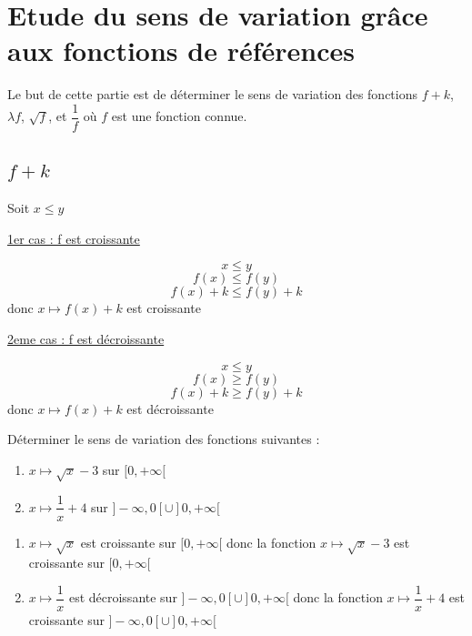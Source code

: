 \section{Etude du sens de variation grâce aux fonctions de références}
Le but de cette partie est de déterminer le sens de variation des fonctions $f + k$, $\lambda f$, $\sqrt{f}$, et $\dfrac{1}{f}$ où $f$ est une fonction connue.
\subsection{$f+k$}
\newline

\begin{preuve}
Soit $x\leq y$\newline

\underline{1er cas : f est croissante}\newline

$$x \leq y$$
$$f(x) \leq f(y)$$
$$f(x) + k \leq f(y) + k$$
donc $x\mapsto f(x) + k$ est croissante \newline

\underline{2eme cas : f est décroissante}\newline

$$x \leq y$$
$$f(x) \geq f(y)$$
$$f(x) + k \geq f(y) + k$$
donc $x\mapsto f(x) + k$ est décroissante
\end{preuve}
\begin{exemples}
Déterminer le sens de variation des fonctions suivantes : 
\begin{enumerate}
\item $x\mapsto \sqrt{x} - 3$ sur $[0,+\infty[$
\item $x\mapsto \dfrac{1}{x} + 4$ sur $]-\infty,0[ \cup ]0,+\infty[$
\end{enumerate}
\begin{enumerate}
\item $x\mapsto \sqrt{x}$ est croissante sur $[0,+\infty[$ donc la fonction $x\mapsto \sqrt{x} - 3$ est croissante sur $[0,+\infty[$
\item $x\mapsto \dfrac{1}{x}$ est décroissante sur $]-\infty,0[ \cup ]0,+\infty[$ donc la fonction $x\mapsto \dfrac{1}{x} + 4$ est croissante sur $]-\infty,0[ \cup ]0,+\infty[$
\end{enumerate}
\end{exemples}
